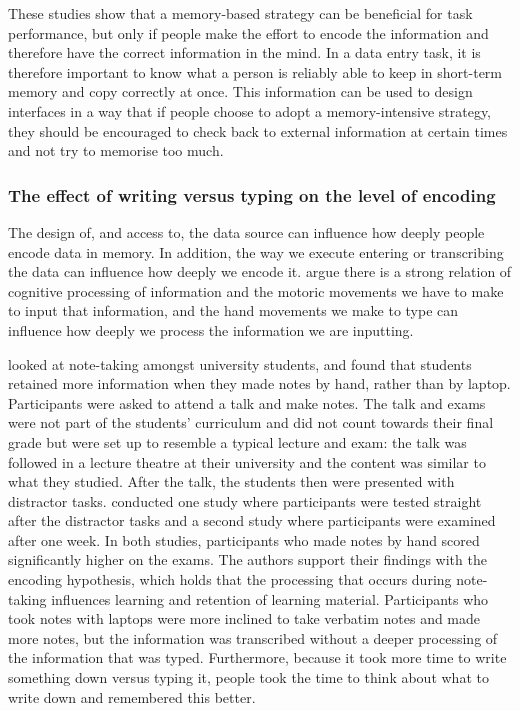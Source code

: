 \documentclass[11pt,oneside]{report}
\begin{document}
These studies show that a memory-based strategy can be beneficial for task performance, but only if people make the effort to encode the information and therefore have the correct information in the mind. In a data entry task, it is therefore important to know what a person is reliably able to keep in short-term memory and copy correctly at once. This information can be used to design interfaces in a way that if people choose to adopt a memory-intensive strategy, they should be encouraged to check back to external information at certain times and not try to memorise too much.

\subsubsection{The effect of writing versus typing on the level of encoding}
The design of, and access to, the data source can influence how deeply people encode data in memory. In addition, the way we execute entering or transcribing the data can influence how deeply we encode it. \citet{Mangen2010} argue there is a strong relation of cognitive processing of information and the motoric movements we have to make to input that information, and the hand movements we make to type can influence how deeply we process the information we are inputting. 

\citet{Mueller2014} looked at note-taking amongst university students, and found that students retained more information when they made notes by hand, rather than by laptop. Participants were asked to attend a talk and make notes.
The talk and exams were not part of the students' curriculum and did not count towards their final grade but were set up to resemble a typical lecture and exam: the talk was followed in a lecture theatre at their university and the content was similar to what they studied. 
After the talk, the students then were presented with distractor tasks. 
\citet{Mueller2014} conducted one study where participants were tested straight after the distractor tasks and a second study where participants were examined after one week. 
In both studies, participants who made notes by hand scored significantly higher on the exams. The authors support their findings with the encoding hypothesis, which holds that the processing that occurs during note-taking influences learning and retention of learning material.  Participants who took notes with laptops were more inclined to take verbatim notes and made more notes, but the information was transcribed without a deeper processing of the information that was typed. 
Furthermore, because it took more time to write something down versus typing it, people took the time to think about what to write down and remembered this better.
\end{document}
